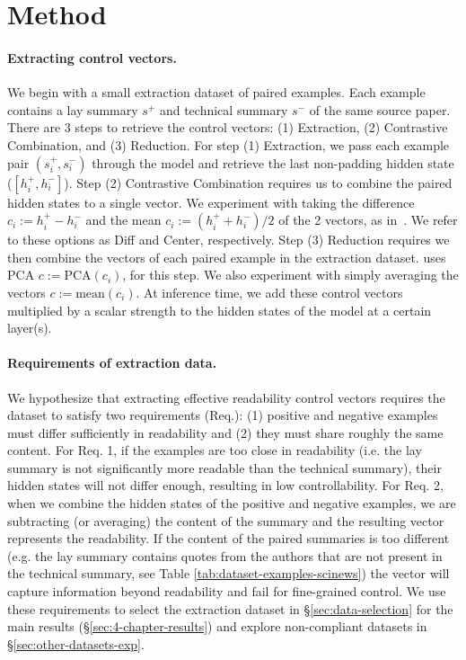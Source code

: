 \section{Method}\label{sec:4-chapter-method}

\paragraph{Extracting control vectors.} 
We begin with a small extraction dataset of paired examples. Each example contains a lay summary $s^{+}$ and technical summary $s^{-}$ of the same source paper. There are 3 steps to retrieve the control vectors: (1) Extraction, (2) Contrastive Combination, and (3) Reduction. For step (1) Extraction, we pass each example pair $(s^+_{i}, s^-_{i})$ through the model and retrieve the last non-padding hidden state ($[h^+_i, h^-_i]$).  Step (2) Contrastive Combination requires us to combine the paired hidden states to a single vector. We experiment with taking the difference $c_{i} := h^+_i - h^-_i$ and the mean $c_{i} := (h^+_i + h^-_i )/2$ of the 2 vectors, as in~\textcite{luo2022readability}. We refer to these options as \textrm{Diff} and \textrm{Center}, respectively. Step (3) Reduction requires we then combine the vectors of each paired example in the extraction dataset. \textcite{luo2022readability} uses PCA $c := \textrm{PCA}(c_i)$, for this step. We also experiment with simply averaging the vectors $c := \textrm{mean}(c_i)$.
At inference time, we add these control vectors multiplied by a scalar strength to the hidden states of the model at a certain layer(s). 

\paragraph{Requirements of extraction data.} We hypothesize that extracting effective readability control vectors requires the dataset to satisfy two requirements (Req.): (1) positive and negative examples must differ sufficiently in readability and (2) they must share roughly the same content. For Req. 1, if the examples are too close in readability (i.e. the lay summary is not significantly more readable than the technical summary), their hidden states will not differ enough, resulting in low controllability. For Req. 2, when we combine the hidden states of the positive and negative examples, we are subtracting (or averaging) the content of the summary and the resulting vector represents the readability. If the content of the paired summaries is too different (e.g. the lay summary contains quotes from the authors that are not present in the technical summary, see Table \ref{tab:dataset-examples-scinews}) the vector will capture information beyond readability and fail for fine-grained control. We use these requirements to select the extraction dataset in \S\ref{sec:data-selection} for the main results (\S\ref{sec:4-chapter-results}) and explore non-compliant datasets in \S\ref{sec:other-datasets-exp}.


